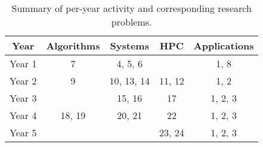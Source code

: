 
\begin{table}
\centering
\begin{tabular}{|c|c|c|c|c|}
  \toprule
  {\bf Year} & {\bf Algorithms} & {\bf Systems} & {\bf HPC}  & {\bf Applications}\\
  \midrule
  Year 1 & 7      & 4, 5, 6    &        & 1, 8     \\
  Year 2 & 9      & 10, 13, 14 & 11, 12 & 1, 2     \\
  Year 3 &        & 15, 16     & 17     & 1, 2, 3  \\
  Year 4 & 18, 19 & 20, 21     & 22     & 1, 2, 3  \\
  Year 5 &        &            & 23, 24 & 1, 2, 3  \\
  \bottomrule
\end{tabular}
\caption{Summary of per-year activity and corresponding research problems.}
\label{tab:timneline}
\vspace{-0.3cm}
\end{table}


\iffalse
{}

